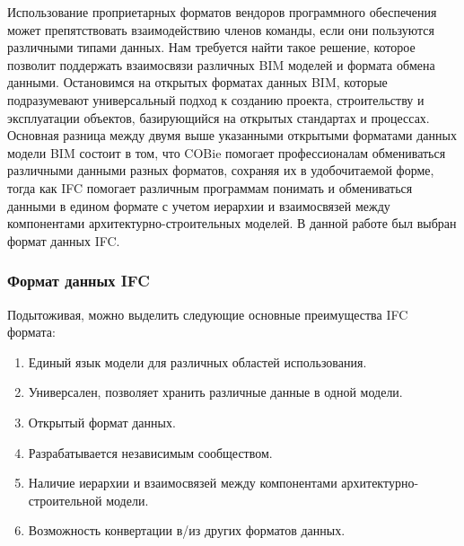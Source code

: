 \documentclass[a4paper,14pt]{extreport} %
\begin{document}
Использование проприетарных форматов вендоров программного обеспечения может препятствовать взаимодействию членов команды, если они пользуются различными типами данных. Нам требуется найти такое решение, которое позволит поддержать взаимосвязи различных BIM моделей и формата обмена данными. Остановимся на открытых форматах данных BIM, которые подразумевают универсальный подход к созданию проекта, строительству и эксплуатации объектов, базирующийся на открытых стандартах и процессах. \\
Основная разница между двумя выше указанными открытыми форматами данных модели BIM состоит в том, что COBie помогает профессионалам обмениваться различными данными разных форматов, сохраняя их в удобочитаемой форме, тогда как IFC помогает различным программам понимать и обмениваться данными в едином формате с учетом иерархии и взаимосвязей между компонентами архитектурно-строительных моделей. В данной работе был выбран формат данных IFC. \\

\subsubsection{Формат данных IFC}
Подытоживая, можно выделить следующие основные преимущества IFC формата:
\begin{enumerate}
\item Единый язык модели для различных областей использования.
\item Универсален, позволяет хранить различные данные в одной модели.
\item Открытый формат данных.
\item Разрабатывается независимым сообществом.
\item Наличие иерархии и взаимосвязей между компонентами архитектурно-строительной модели.
\item Возможность конвертации в/из других форматов данных.
\end{enumerate} 
\end{document}
